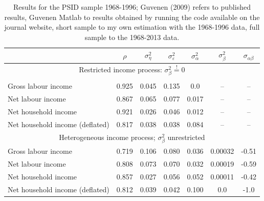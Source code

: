 \begin{table}%
\begin{tabular}{l|cccccc}
                     &$\rho$ & $\sigma^2_{\eta}$&$\sigma^2_{\varepsilon}$&$\sigma^2_{\alpha}$&$\sigma^2_{\beta}$&$\sigma_{\alpha \beta}$\\
\hline
\hline
\multicolumn{7}{c}{Restricted income process: $\sigma^2_{\beta} \stackrel{!}{=} 0$} \\
\hline \\
Gross labour income   & 0.925 &  0.045           &   0.135                &       0.0         &        --        &        --             \\
Net labour income     & 0.867 &  0.065           &   0.077                &       0.017       &        --        &        --             \\
Net household income  & 0.921 &  0.026           &   0.046                &       0.012       &        --        &        --             \\
Net household income (deflated) & 0.817 &  0.038 &   0.038                &       0.084       &        --        &        --             \\
\hline
\multicolumn{7}{c}{Heterogeneous income process; $\sigma^2_{\beta}$ unrestricted} \\
\hline
Gross labour income   & 0.719 &  0.106           &   0.080                &       0.036       &     0.00032      &       -0.51           \\
Net labour income     & 0.808 &  0.073           &   0.070                &       0.032       &     0.00019      &       -0.59           \\
Net household income  & 0.857 &  0.027           &   0.056                &       0.052       &     0.00011      &       -0.42           \\
Net household income (deflated) & 0.812 &  0.039 &   0.042                &       0.100       &        0.0       &       -1.0            \\
\hline
\end{tabular}
\caption{Results for the PSID sample 1968-1996; Guvenen (2009) refers to published results, Guvenen Matlab to results obtained by running
the code available on the journal website, short sample to my own estimation with the 1968-1996 data, full sample to the 1968-2013 data.}
\label{tab:BHPS_results}
\end{table}


